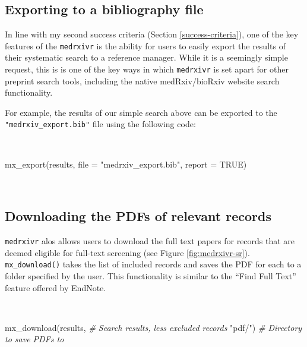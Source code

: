 \documentclass[a4paper, twoside]{templates/ociamthesis}
\newenvironment{Shaded}{\begin{snugshade}}{\end{snugshade}}
\newcommand{\AttributeTok}[1]{\textcolor[rgb]{0.77,0.63,0.00}{#1}}
\newcommand{\CommentTok}[1]{\textcolor[rgb]{0.56,0.35,0.01}{\textit{#1}}}
\newcommand{\ConstantTok}[1]{\textcolor[rgb]{0.00,0.00,0.00}{#1}}
\newcommand{\FunctionTok}[1]{\textcolor[rgb]{0.00,0.00,0.00}{#1}}
\newcommand{\NormalTok}[1]{#1}
\newcommand{\StringTok}[1]{\textcolor[rgb]{0.31,0.60,0.02}{#1}}
\renewenvironment{Shaded}
{
  \vspace{4pt}%
  \begin{snugshade}%
}{%
  \end{snugshade}%
  \vspace{4pt}%
}
\begin{document}
\hypertarget{exporting-to-a-bibliography-file}{%
\subsection{Exporting to a bibliography file}\label{exporting-to-a-bibliography-file}}

In line with my second success criteria (Section \ref{success-criteria}), one of the key features of the \texttt{medrxivr} is the ability for users to easily export the results of their systematic search to a reference manager. While it is a seemingly simple request, this is is one of the key ways in which \texttt{medrxivr} is set apart for other preprint search tools, including the native medRxiv/bioRxiv website search functionality.

For example, the results of our simple search above can be exported to the \texttt{"medrxiv\_export.bib"} file using the following code:

~

\begin{Shaded}
\begin{Highlighting}[]
\FunctionTok{mx\_export}\NormalTok{(results, }
          \AttributeTok{file =} \StringTok{"medrxiv\_export.bib"}\NormalTok{,}
          \AttributeTok{report =} \ConstantTok{TRUE}\NormalTok{)}
\end{Highlighting}
\end{Shaded}

~

\hypertarget{downloading-the-pdfs-of-relevant-records}{%
\subsection{Downloading the PDFs of relevant records}\label{downloading-the-pdfs-of-relevant-records}}

\texttt{medrxivr} alos allows users to download the full text papers for records that are deemed eligible for full-text screening (see Figure \ref{fig:medrxivr-sr}). \texttt{mx\_download()} takes the list of included records and saves the PDF for each to a folder specified by the user. This functionality is similar to the ``Find Full Text'' feature offered by EndNote.

~

\begin{Shaded}
\begin{Highlighting}[]
\FunctionTok{mx\_download}\NormalTok{(results,  }\CommentTok{\# Search results, less excluded records}
            \StringTok{"pdf/"}\NormalTok{)   }\CommentTok{\# Directory to save PDFs to }
\end{Highlighting}
\end{Shaded}
\end{document}
